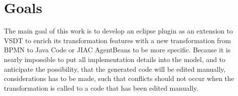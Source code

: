 \section{Goals}
\label{sec:Goals}
The main goal of this work is to develop an eclipse plugin as an extension to VSDT to enrich its transformation features with a new transformation from BPMN to Java Code or JIAC AgentBeans to be more specific. Because it is nearly impossible to put all implementation  details into the model, and to anticipate the possibility, that the generated code will be edited manually, considerations has to be made, such that conflicts should not occur when the transformation is called to a code that has been edited manually. 


